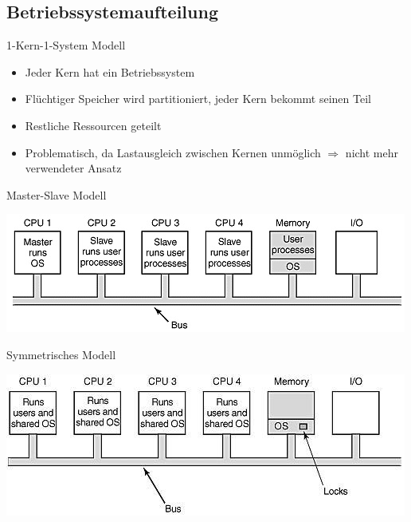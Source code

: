 \subsection{Betriebssystemaufteilung}
\begin{frame}{1-Kern-1-System Modell}
	\begin{itemize}
		\item Jeder Kern hat ein Betriebssystem
		\item Flüchtiger Speicher wird partitioniert, jeder Kern bekommt seinen Teil
		\item Restliche Ressourcen geteilt
		\item Problematisch, da Lastausgleich zwischen Kernen unmöglich \(\Rightarrow\) nicht mehr verwendeter Ansatz
	\end{itemize}
\end{frame}

\begin{frame}{Master-Slave Modell}
	\begin{center}
		\includegraphics[scale=0.75]{images/assym} \cite{sureshPic}
	\end{center}		
\end{frame}

\begin{frame}{Symmetrisches Modell}
	\begin{center}
		\includegraphics[scale=0.75]{images/symm} \cite{sureshPic}
	\end{center}
\end{frame}



